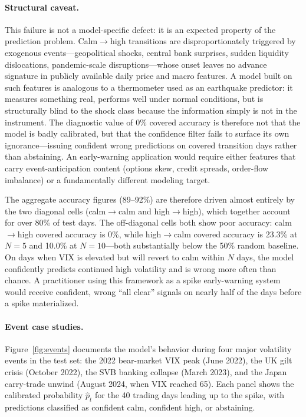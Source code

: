 \documentclass[12pt]{article}
\begin{document}
\paragraph{Structural caveat.}
This failure is not a model-specific defect: it is an expected property of the prediction problem. Calm$\to$high transitions are disproportionately triggered by exogenous events---geopolitical shocks, central bank surprises, sudden liquidity dislocations, pandemic-scale disruptions---whose onset leaves no advance signature in publicly available daily price and macro features. A model built on such features is analogous to a thermometer used as an earthquake predictor: it measures something real, performs well under normal conditions, but is structurally blind to the shock class because the information simply is not in the instrument. The diagnostic value of 0\% covered accuracy is therefore not that the model is badly calibrated, but that the confidence filter fails to surface its own ignorance---issuing confident wrong predictions on covered transition days rather than abstaining. An early-warning application would require either features that carry event-anticipation content (options skew, credit spreads, order-flow imbalance) or a fundamentally different modeling target.

The aggregate accuracy figures (89--92\%) are therefore driven almost entirely by the two diagonal cells (calm$\to$calm and high$\to$high), which together account for over 80\% of test days. The off-diagonal cells both show poor accuracy: calm$\to$high covered accuracy is 0\%, while high$\to$calm covered accuracy is 23.3\% at $N = 5$ and 10.0\% at $N = 10$---both substantially below the 50\% random baseline. On days when VIX is elevated but will revert to calm within $N$ days, the model confidently predicts continued high volatility and is wrong more often than chance. A practitioner using this framework as a spike early-warning system would receive confident, wrong ``all clear'' signals on nearly half of the days before a spike materialized.

\paragraph{Event case studies.}
Figure~\ref{fig:events} documents the model's behavior during four major volatility events in the test set: the 2022 bear-market VIX peak (June 2022), the UK gilt crisis (October 2022), the SVB banking collapse (March 2023), and the Japan carry-trade unwind (August 2024, when VIX reached 65). Each panel shows the calibrated probability $\hat{p}_t$ for the 40 trading days leading up to the spike, with predictions classified as confident calm, confident high, or abstaining.
\end{document}

